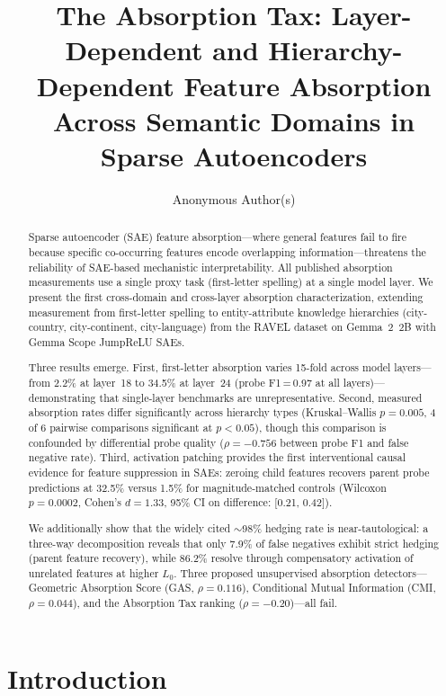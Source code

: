 \documentclass{article}
\title{The Absorption Tax: Layer-Dependent and Hierarchy-Dependent Feature Absorption Across Semantic Domains in Sparse Autoencoders}
\author{%
  Anonymous Author(s)
}
\begin{document}
\maketitle

\begin{abstract}
Sparse autoencoder (SAE) feature absorption---where general features fail to fire because specific co-occurring features encode overlapping information---threatens the reliability of SAE-based mechanistic interpretability. All published absorption measurements use a single proxy task (first-letter spelling) at a single model layer. We present the first cross-domain and cross-layer absorption characterization, extending measurement from first-letter spelling to entity-attribute knowledge hierarchies (city-country, city-continent, city-language) from the RAVEL dataset on Gemma~2~2B with Gemma Scope JumpReLU SAEs.

Three results emerge. First, first-letter absorption varies 15-fold across model layers---from 2.2\% at layer~18 to 34.5\% at layer~24 (probe F1\,=\,0.97 at all layers)---demonstrating that single-layer benchmarks are unrepresentative. Second, measured absorption rates differ significantly across hierarchy types (Kruskal--Wallis $p = 0.005$, 4 of 6 pairwise comparisons significant at $p < 0.05$), though this comparison is confounded by differential probe quality ($\rho = -0.756$ between probe F1 and false negative rate). Third, activation patching provides the first interventional causal evidence for feature suppression in SAEs: zeroing child features recovers parent probe predictions at 32.5\% versus 1.5\% for magnitude-matched controls (Wilcoxon $p = 0.0002$, Cohen's $d = 1.33$, 95\% CI on difference: [0.21, 0.42]).

We additionally show that the widely cited ${\sim}$98\% hedging rate is near-tautological: a three-way decomposition reveals that only 7.9\% of false negatives exhibit strict hedging (parent feature recovery), while 86.2\% resolve through compensatory activation of unrelated features at higher $L_0$. Three proposed unsupervised absorption detectors---Geometric Absorption Score (GAS, $\rho = 0.116$), Conditional Mutual Information (CMI, $\rho = 0.044$), and the Absorption Tax ranking ($\rho = -0.20$)---all fail.
\end{abstract}

\section{Introduction}
\label{sec:intro}
\end{document}
